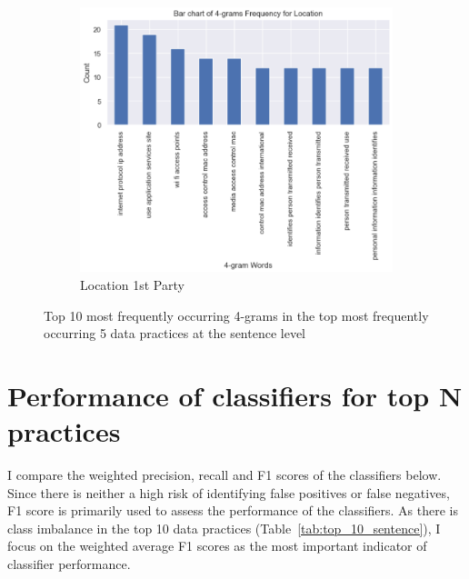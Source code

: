 \begin{figure}[!ht]
	\begin{subfigure}[t]{.5\textwidth}
		\centering
		\includegraphics[width=\linewidth]{figures/4_grams_location.png}
		\caption{Location 1st Party}
	\end{subfigure}
	\caption{Top 10 most frequently occurring 4-grams in the top most frequently occurring 5 data practices at the sentence level}
	\label{fig:4_grams_sentence}
  \end{figure}

\section{Performance of classifiers for top N practices}
I compare the weighted precision, recall and F1 scores of the classifiers below. Since there is neither a high risk of identifying false positives or false negatives, F1 score is primarily used to assess the performance of the classifiers. As there is class imbalance in the top 10 data practices (Table~\ref{tab:top_10_sentence}), I focus on the weighted average F1 scores as the most important indicator of classifier performance. 

